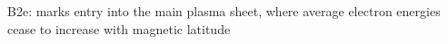 
 B2e: marks entry into the main plasma sheet, where average electron
 energies cease to increase with magnetic latitude
